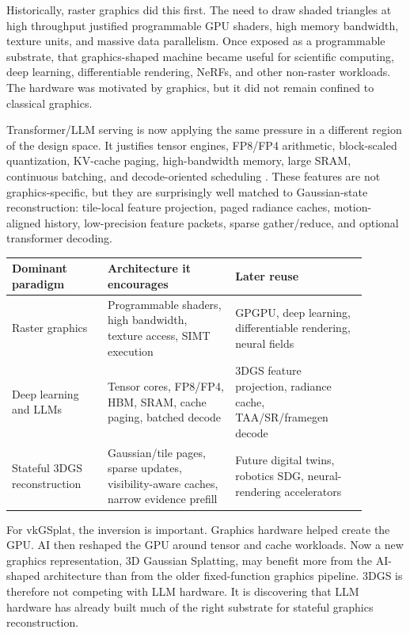 \documentclass[11pt]{article}
\begin{document}
Historically, raster graphics did this first. The need to draw shaded triangles
at high throughput justified programmable GPU shaders, high memory bandwidth,
texture units, and massive data parallelism. Once exposed as a programmable
substrate, that graphics-shaped machine became useful for scientific computing,
deep learning, differentiable rendering, NeRFs, and other non-raster workloads.
The hardware was motivated by graphics, but it did not remain confined to
classical graphics.

Transformer/LLM serving is now applying the same pressure in a different
region of the design space. It justifies tensor engines, FP8/FP4 arithmetic,
block-scaled quantization, KV-cache paging, high-bandwidth memory, large SRAM,
continuous batching, and decode-oriented scheduling \cite{nvidia2022hopper,
nvidia2026transformerenginefp8,nvidia2026nvfp4,kwon2023pagedattention,
prabhu2025vattention}. These features are not graphics-specific, but they are
surprisingly well matched to Gaussian-state reconstruction: tile-local feature
projection, paged radiance caches, motion-aligned history, low-precision
feature packets, sparse gather/reduce, and optional transformer decoding.

\begin{center}
\small
\begin{tabular}{p{0.24\linewidth}p{0.32\linewidth}p{0.33\linewidth}}
\toprule
Dominant paradigm & Architecture it encourages & Later reuse \\
\midrule
Raster graphics & Programmable shaders, high bandwidth, texture access, SIMT execution & GPGPU, deep learning, differentiable rendering, neural fields \\
Deep learning and LLMs & Tensor cores, FP8/FP4, HBM, SRAM, cache paging, batched decode & 3DGS feature projection, radiance cache, TAA/SR/framegen decode \\
Stateful 3DGS reconstruction & Gaussian/tile pages, sparse updates, visibility-aware caches, narrow evidence prefill & Future digital twins, robotics SDG, neural-rendering accelerators \\
\bottomrule
\end{tabular}
\end{center}

For vkGSplat, the inversion is important. Graphics hardware helped create the
GPU. AI then reshaped the GPU around tensor and cache workloads. Now a new
graphics representation, 3D Gaussian Splatting, may benefit more from the
AI-shaped architecture than from the older fixed-function graphics pipeline.
3DGS is therefore not competing with LLM hardware. It is discovering that LLM
hardware has already built much of the right substrate for stateful graphics
reconstruction.
\end{document}
